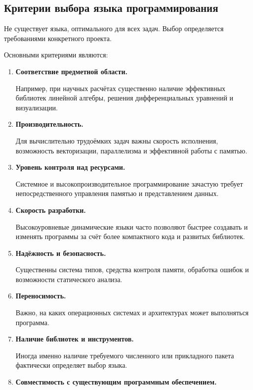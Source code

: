 \subsection{Критерии выбора языка программирования}

Не существует языка, оптимального для всех задач. Выбор определяется
требованиями конкретного проекта.

Основными критериями являются:

\begin{enumerate}
	\item \textbf{Соответствие предметной области.}
	
	Например, при научных расчётах существенно наличие эффективных библиотек
	линейной алгебры, решения дифференциальных уравнений и визуализации.
	
	\item \textbf{Производительность.}
	
	Для вычислительно трудоёмких задач важны скорость исполнения,
	возможность векторизации, параллелизма и эффективной работы с памятью.
	
	\item \textbf{Уровень контроля над ресурсами.}
	
	Системное и высокопроизводительное программирование зачастую требует
	непосредственного управления памятью и представлением данных.
	
	\item \textbf{Скорость разработки.}
	
	Высокоуровневые динамические языки часто позволяют быстрее создавать и
	изменять программы за счёт более компактного кода и развитых библиотек.
	
	\item \textbf{Надёжность и безопасность.}
	
	Существенны система типов, средства контроля памяти, обработка ошибок и
	возможности статического анализа.
	
	\item \textbf{Переносимость.}
	
	Важно, на каких операционных системах и архитектурах может выполняться
	программа.
	
	\item \textbf{Наличие библиотек и инструментов.}
	
	Иногда именно наличие требуемого численного или прикладного пакета
	фактически определяет выбор языка.
	
	\item \textbf{Совместимость с существующим программным обеспечением.}
	

\end{enumerate}
